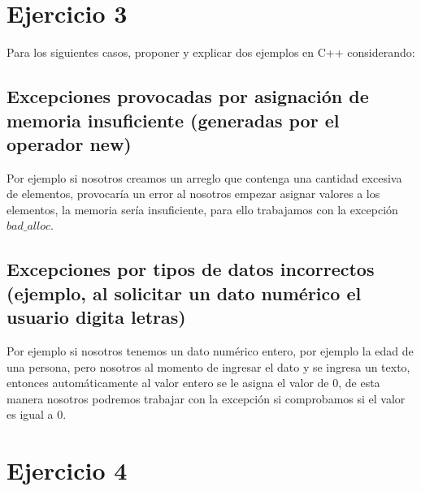 \documentclass[12pt]{article}
\begin{document}
\section{Ejercicio 3}

Para los siguientes casos, proponer y explicar dos ejemplos en C++
considerando:

\subsection{Excepciones provocadas por asignación de memoria insuficiente
(generadas por el operador new)}

Por ejemplo si nosotros creamos un arreglo que contenga una cantidad excesiva de elementos, provocaría un error al nosotros empezar asignar valores a los elementos, la memoria sería insuficiente, para ello trabajamos con la excepción $bad\_alloc$.

\subsection{Excepciones por tipos de datos incorrectos (ejemplo, al solicitar un dato
numérico el usuario digita letras)}

Por ejemplo si nosotros tenemos un dato numérico entero, por ejemplo la edad de una persona, pero nosotros al momento de ingresar el dato y se ingresa un texto, entonces automáticamente al valor entero se le asigna el valor de 0, de esta manera nosotros podremos trabajar con la excepción si comprobamos si el valor es igual a 0.

\section{Ejercicio 4}
\end{document}
